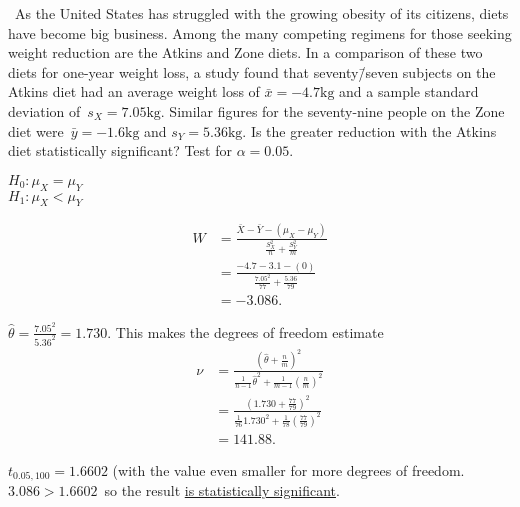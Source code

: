 \begin{problem}
  ~As the United States has struggled with the growing obesity of its citizens, diets have become big business. Among the many competing regimens for those seeking weight reduction are the Atkins and Zone diets. In a comparison of these two diets for one-year weight loss, a study found that seventy\=/seven subjects on the Atkins diet had an average weight loss of ${\bar{x} = -4.7\text{kg}}$ and a sample standard deviation of~${s_X =7.05\text{kg}}$. Similar figures for the seventy-nine people on the Zone diet were~${\bar{y} = -1.6\text{kg}}$ and ${s_Y = 5.36\text{kg}}$. Is the greater reduction with the Atkins diet statistically significant? Test for ${\alpha = 0.05}$.
\end{problem}

\noindent
${H_0: \mu_{X} = \mu_{Y}}$ \\
${H_1: \mu_{X} < \mu_{Y}}$

\begin{align}
  W &= \frac{\bar{X} - \bar{Y} - (\mu_{X} - \mu_{Y})}{\frac{S_{X}^{2}}{n} + \frac{S_{Y}^{2}}{m}} \\
    &= \frac{-4.7 - 3.1 - (0)}{\frac{7.05^2}{77}+\frac{5.36}{79}} \\
    &= -3.086\text{.}
\end{align}

${\hat{\theta} = \frac{7.05^2}{5.36^2} = 1.730}$.  This makes the degrees of freedom estimate
\begin{align}
  \nu &= \frac{(\hat{\theta} + \frac{n}{m})^2}{\frac{1}{n-1}\hat{\theta}^2 + \frac{1}{m-1}\left(\frac{n}{m}\right)^2} \\
      &= \frac{\left(1.730 + \frac{77}{79}\right)^2}{\frac{1}{76} 1.730^2 + \frac{1}{78}\left(\frac{77}{79}\right)^2} \\
      &= 141.88 \text{.}
\end{align}

${t_{0.05,100} = 1.6602}$ (with the value even smaller for more degrees of freedom.  ${3.086 > 1.6602}$~so  the result \underline{is statistically significant}.
